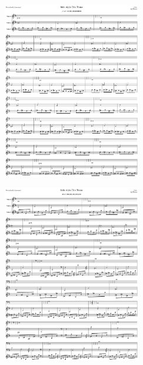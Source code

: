 \begin{figure}[H]                                             
{                                                             
  \setlength{\tabcolsep}{3.0pt}                               
  \setlength\cmidrulewidth{\heavyrulewidth} %
    \begin{subfigure}{0.5\textwidth}                            
  \includegraphics[width=6cm]{music/title_no_47_page_1001.png}%
    \end{subfigure}                                             
  \begin{subfigure}{0.5\textwidth}                            
  \includegraphics[width=6cm]{music/title_no_48_page_1001.png}%
    \end{subfigure}                                             
}                                                             
\end{figure}                                                  


